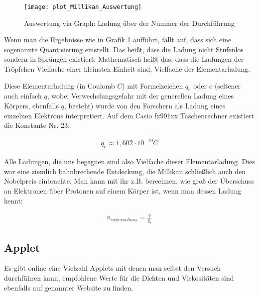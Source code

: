 \begin{figure}[h!]
	\center
	\texttt{[image: plot\_Millikan\_Auswertung]}
	\begin{comment}
Gnuplot: './plot_millikan.p'
	\end{comment}
	\caption{Auswertung via Graph: Ladung über der Nummer der  Durchführung}
	\label{fig:millikan_auswertung}
\end{figure}

Wenn man die Ergebnisse wie in Grafik \ref{fig:millikan_auswertung} aufführt, fällt auf, dass sich eine sogenannte Quantisierung einstellt. Das heißt, dass die Ladung nicht \glqq Stufenlos\grqq{} sondern in \glqq Sprüngen\grqq{} existiert. Mathematisch heißt das, dass die Ladungen der Tröpfchen Vielfache einer kleinsten Einheit sind, Vielfache der \glqq Elementarladung\grqq .

Diese Elementarladung (in Coulomb $C$) mit Formelzeichen $q_e$ oder $e$ (seltener auch einfach $q$, wobei Verwechslungsgefahr mit der generellen Ladung eines Körpers, ebenfalls $q$, besteht) wurde von den Forschern als Ladung eines einzelnen Elektrons interpretiert. Auf dem Casio fx991xx Taschenrechner existiert die Konstante Nr. 23:

\begin{align}
	q_e \approx 1,602 \cdot 10^{-19} C
\end{align}

Alle Ladungen, die uns begegnen sind also Vielfache dieser Elementarladung. Dies war eine ziemlich bahnbrechende Entdeckung, die Millikan schließlich auch den Nobelpreis einbrachte. Man kann mit ihr z.B. berechnen, wie groß der Überschuss an Elektronen über Protonen auf einem Körper ist, wenn man dessen Ladung kennt:

\begin{align}
	n_{ueberschuss} = \frac{q}{q_e}
\end{align}


\subsection{Applet}

Es gibt online eine Vielzahl Applets mit denen man selbst den Versuch durchführen kann, empfohlene Werte für die Dichten und Viskositäten sind ebenfalls auf genannter Website zu finden.




